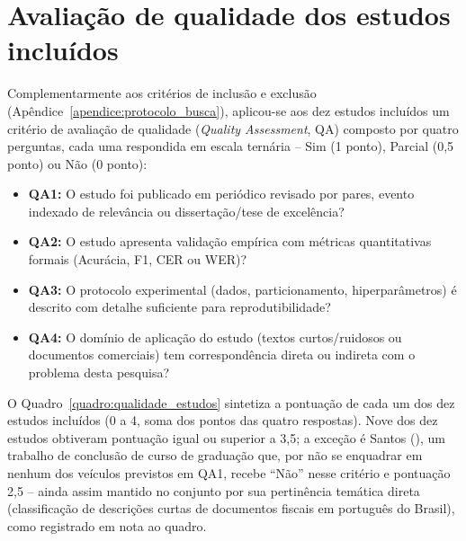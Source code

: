 \section{Avaliação de qualidade dos estudos incluídos}
\label{sec:rel_qualidade}

Complementarmente aos critérios de inclusão e exclusão (Apêndice~\ref{apendice:protocolo_busca}), aplicou-se aos dez estudos incluídos um critério de avaliação de qualidade (\textit{Quality Assessment}, QA) composto por quatro perguntas, cada uma respondida em escala ternária -- Sim (1 ponto), Parcial (0,5 ponto) ou Não (0 ponto):
\begin{itemize}
	\item \textbf{QA1:} O estudo foi publicado em periódico revisado por pares, evento indexado de relevância ou dissertação/tese de excelência?
	\item \textbf{QA2:} O estudo apresenta validação empírica com métricas quantitativas formais (Acurácia, F1, CER ou WER)?
	\item \textbf{QA3:} O protocolo experimental (dados, particionamento, hiperparâmetros) é descrito com detalhe suficiente para reprodutibilidade?
	\item \textbf{QA4:} O domínio de aplicação do estudo (textos curtos/ruidosos ou documentos comerciais) tem correspondência direta ou indireta com o problema desta pesquisa?
\end{itemize}

O Quadro~\ref{quadro:qualidade_estudos} sintetiza a pontuação de cada um dos dez estudos incluídos (0 a 4, soma dos pontos das quatro respostas). Nove dos dez estudos obtiveram pontuação igual ou superior a 3,5; a exceção é Santos (\citeyear{santos2023classificacao}), um trabalho de conclusão de curso de graduação que, por não se enquadrar em nenhum dos veículos previstos em QA1, recebe ``Não'' nesse critério e pontuação 2,5 -- ainda assim mantido no conjunto por sua pertinência temática direta (classificação de descrições curtas de documentos fiscais em português do Brasil), como registrado em nota ao quadro.

